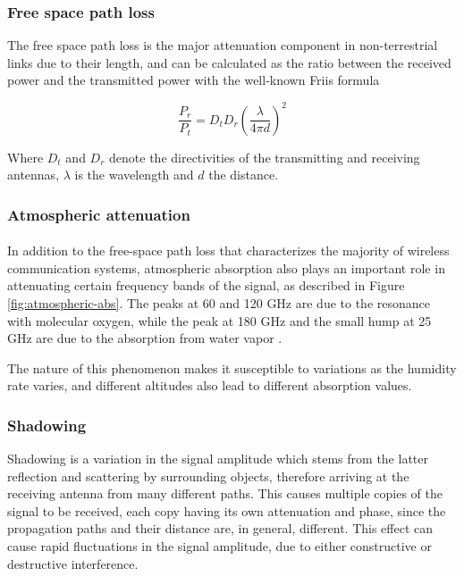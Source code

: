 \subsubsection{Free space path loss}
The free space path loss is the major attenuation component in non-terrestrial links due to their length, and can be calculated as the ratio between the received power and the transmitted power with the well-known Friis formula 

\begin{equation}
    \frac{P_r}{P_t} = D_tD_r\left(\frac{\lambda}{4\pi d}\right)^2
    \label{eqn:fspl}
\end{equation}

Where $D_t$ and $D_r$ denote the directivities of the transmitting and receiving antennas, $\lambda$ is the wavelength and $d$ the distance.


\subsubsection{Atmospheric attenuation}
\paragraph{}
In addition to the free-space path loss that characterizes the majority of wireless communication systems, atmospheric absorption also plays an important role in attenuating certain frequency bands of the signal, as described in Figure \ref{fig:atmospheric-abs}. The peaks at 60 and 120 GHz are due to the resonance with molecular oxygen, while the peak at 180 GHz and the small hump at 25 GHz are due to the absorption from water vapor \cite{e-band-ammar}.

The nature of this phenomenon makes it susceptible to variations as the humidity rate varies, and different altitudes also lead to different absorption values.

\subsubsection{Shadowing}
Shadowing is a variation in the signal amplitude which stems from the latter reflection and scattering by surrounding objects, therefore arriving at the receiving antenna from many different paths. This causes multiple copies of the signal to be received, each copy having its own attenuation and phase, since the propagation paths and their distance are, in general, different. This effect can cause rapid fluctuations in the signal amplitude, due to either constructive or destructive interference.

